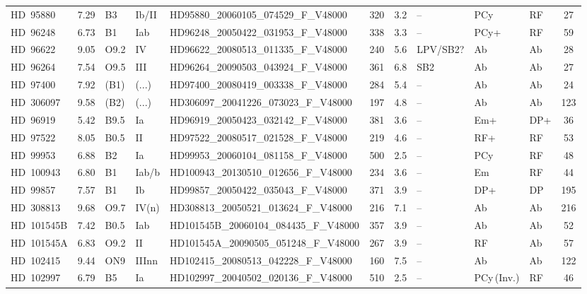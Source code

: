 {\begin{landscape}
\begin{longtable}{lclllcclllc}
\noalign{\smallskip}
HD~95880 & 7.29 & B3 & Ib/II & HD95880\_20060105\_074529\_F\_V48000 & 320 & 3.2 & -- & PCy & RF & 27 \\
\noalign{\smallskip}
HD~96248 & 6.73 & B1 & Iab & HD96248\_20050422\_031953\_F\_V48000 & 338 & 3.3 & -- & PCy+ & RF & 59 \\
\noalign{\smallskip}
HD~96622 & 9.05 & O9.2 & IV & HD96622\_20080513\_011335\_F\_V48000 & 240 & 5.6 & LPV/SB2? & Ab & Ab & 28 \\
\noalign{\smallskip}
HD~96264 & 7.54 & O9.5 & III & HD96264\_20090503\_043924\_F\_V48000 & 361 & 6.8 & SB2 & Ab & Ab & 27 \\
\noalign{\smallskip}
HD~97400 & 7.92 & (B1) & (...) & HD97400\_20080419\_003338\_F\_V48000 & 284 & 5.4 & -- & Ab & Ab & 24 \\
\noalign{\smallskip}
HD~306097 & 9.58 & (B2) & (...) & HD306097\_20041226\_073023\_F\_V48000 & 197 & 4.8 & -- & Ab & Ab & 123 \\
\noalign{\smallskip}
HD~96919 & 5.42 & B9.5 & Ia & HD96919\_20050423\_032142\_F\_V48000 & 381 & 3.6 & -- & Em+ & DP+ & 36 \\
\noalign{\smallskip}
HD~97522 & 8.05 & B0.5 & II & HD97522\_20080517\_021528\_F\_V48000 & 219 & 4.6 & -- & RF+ & RF & 53 \\
\noalign{\smallskip}
HD~99953 & 6.88 & B2 & Ia & HD99953\_20060104\_081158\_F\_V48000 & 500 & 2.5 & -- & PCy & RF & 48 \\
\noalign{\smallskip}
HD~100943 & 6.80 & B1 & Iab/b & HD100943\_20130510\_012656\_F\_V48000 & 234 & 3.6 & -- & Em & RF & 44 \\
\noalign{\smallskip}
HD~99857 & 7.57 & B1 & Ib & HD99857\_20050422\_035043\_F\_V48000 & 371 & 3.9 & -- & DP+ & DP & 195 \\
\noalign{\smallskip}
HD~308813 & 9.68 & O9.7 & IV(n) & HD308813\_20050521\_013624\_F\_V48000 & 216 & 7.1 & -- & Ab & Ab & 216 \\
\noalign{\smallskip}
HD~101545B & 7.42 & B0.5 & Iab & HD101545B\_20060104\_084435\_F\_V48000 & 357 & 3.9 & -- & Ab & Ab & 52 \\
\noalign{\smallskip}
HD~101545A & 6.83 & O9.2 & II & HD101545A\_20090505\_051248\_F\_V48000 & 267 & 3.9 & -- & RF & Ab & 57 \\
\noalign{\smallskip}
HD~102415 & 9.44 & ON9 & IIInn & HD102415\_20080513\_042228\_F\_V48000 & 160 & 7.5 & -- & Ab & Ab & 122 \\
\noalign{\smallskip}
HD~102997 & 6.79 & B5 & Ia & HD102997\_20040502\_020136\_F\_V48000 & 510 & 2.5 & -- & PCy\,(Inv.) & RF & 46 \\

\end{longtable}
\end{landscape}}
